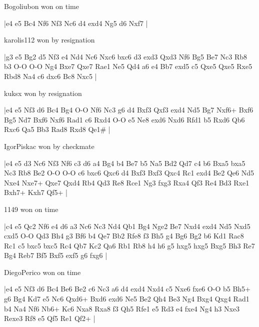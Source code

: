 \showboard

Bogoliubon won on time

\makegametitle
|e4 e5 Bc4 Nf6 Nf3 Nc6 d4 exd4 Ng5 d6 Nxf7  |

\showboard

karolis112 won by resignation

\makegametitle
|g3 e5 Bg2 d5 Nf3 e4 Nd4 Nc6 Nxc6 bxc6 d3 exd3 Qxd3 Nf6 Bg5 Be7 Nc3 Rb8 b3 O-O O-O Ng4 Bxe7 Qxe7 Rae1 Ne5 Qd4 a6 e4 Bb7 exd5 c5 Qxe5 Qxe5 Rxe5 Rbd8 Na4 c6 dxc6 Bc8 Nxc5  |

\showboard

kuksx won by resignation

\makegametitle
|e4 e5 Nf3 d6 Bc4 Bg4 O-O Nf6 Nc3 g6 d4 Bxf3 Qxf3 exd4 Nd5 Bg7 Nxf6+ Bxf6 Bg5 Nd7 Bxf6 Nxf6 Rad1 c6 Rxd4 O-O e5 Ne8 exd6 Nxd6 Rfd1 b5 Rxd6 Qb6 Rxc6 Qa5 Bb3 Rad8 Rxd8 Qe1\#  |

\showboard

IgorPiskac won by checkmate

\makegametitle
|e4 e5 d3 Nc6 Nf3 Nf6 c3 d6 a4 Bg4 b4 Be7 b5 Na5 Bd2 Qd7 c4 b6 Bxa5 bxa5 Nc3 Rb8 Be2 O-O O-O c6 bxc6 Qxc6 d4 Bxf3 Bxf3 Qxc4 Rc1 exd4 Be2 Qe6 Nd5 Nxe4 Nxe7+ Qxe7 Qxd4 Rb4 Qd3 Re8 Rce1 Ng3 fxg3 Rxa4 Qf3 Re4 Bd3 Rxe1 Bxh7+ Kxh7 Qf5+  |

\showboard

1149 won on time

\makegametitle
|c4 e5 Qc2 Nf6 e4 d6 a3 Nc6 Nc3 Nd4 Qb1 Bg4 Nge2 Be7 Nxd4 exd4 Nd5 Nxd5 cxd5 O-O Qd3 Bh4 g3 Bf6 b4 Qe7 Bb2 Rfe8 f3 Bh5 g4 Bg6 Bg2 b6 Kd1 Rac8 Rc1 c5 bxc5 bxc5 Rc4 Qb7 Kc2 Qa6 Rb1 Rb8 h4 h6 g5 hxg5 hxg5 Bxg5 Bh3 Re7 Bg4 Reb7 Bf5 Bxf5 exf5 g6 fxg6  |

\showboard

DiegoPerico won on time

\makegametitle
|e4 e5 Nf3 d6 Bc4 Be6 Be2 c6 Nc3 a6 d4 exd4 Nxd4 c5 Nxe6 fxe6 O-O b5 Bh5+ g6 Bg4 Kd7 e5 Nc6 Qxd6+ Bxd6 exd6 Ne5 Be2 Qh4 Be3 Ng4 Bxg4 Qxg4 Rad1 b4 Na4 Nf6 Nb6+ Kc6 Nxa8 Rxa8 f3 Qh5 Rfe1 e5 Rd3 e4 fxe4 Ng4 h3 Nxe3 Rexe3 Rf8 e5 Qf5 Re1 Qf2+  |

